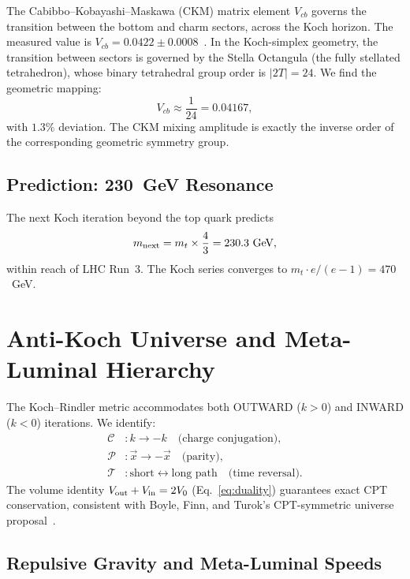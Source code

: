 \documentclass[twocolumn,showpacs,preprintnumbers,amsmath,amssymb,prl]{revtex4-2}
\begin{document}
The Cabibbo--Kobayashi--Maskawa (CKM) matrix element $V_{cb}$ governs the transition
between the bottom and charm sectors, across the Koch horizon. The measured value
is $V_{cb} = 0.0422\pm0.0008$~\cite{PDG2024}.
In the Koch-simplex geometry, the transition between sectors is governed by the
Stella Octangula (the fully stellated tetrahedron), whose binary tetrahedral group
order is $|2T| = 24$. We find the geometric mapping:
\begin{equation}
    V_{cb} \approx \frac{1}{24} = 0.04167,
    \label{eq:vcb}
\end{equation}
with $1.3\%$ deviation. The CKM mixing amplitude is exactly the inverse order of
the corresponding geometric symmetry group.

\subsection{Prediction: 230~GeV Resonance}

The next Koch iteration beyond the top quark predicts
\begin{equation}
    m_{\rm next} = m_t \times \frac{4}{3} = 230.3~\text{GeV},
    \label{eq:230prediction}
\end{equation}
within reach of LHC Run~3. The Koch series converges to
$m_t \cdot e/(e-1) = 470$~GeV.

\section{Anti-Koch Universe and Meta-Luminal Hierarchy}
\label{sec:antikoch}

The Koch--Rindler metric accommodates both OUTWARD ($k > 0$) and
INWARD ($k < 0$) iterations. We identify:
\begin{align}
    \mathcal{C}&: k \to -k \quad \text{(charge conjugation)}, \\
    \mathcal{P}&: \vec{x} \to -\vec{x} \quad \text{(parity)}, \\
    \mathcal{T}&: \text{short} \leftrightarrow \text{long path}
        \quad \text{(time reversal)}.
\end{align}
The volume identity $V_{\rm out} + V_{\rm in} = 2V_0$ (Eq.~\ref{eq:duality})
guarantees exact CPT conservation, consistent with Boyle, Finn, and
Turok's CPT-symmetric universe proposal~\cite{BoyleTurok2018}.

\subsection{Repulsive Gravity and Meta-Luminal Speeds}
\end{document}
